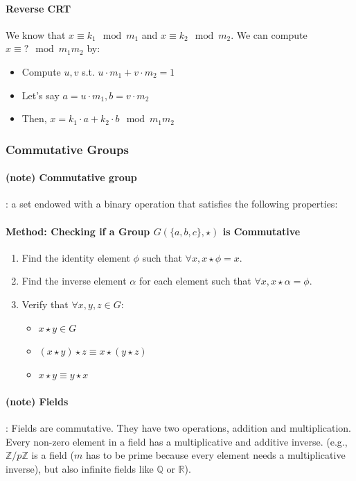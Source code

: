 \documentclass{article}
\begin{document}
\paragraph{Reverse CRT} We know that \( x \equiv k_1 \mod m_1 \) and \( x \equiv k_2 \mod m_2 \). We can compute \( x \equiv ? \mod m_1 m_2 \) by:
\begin{itemize}
    \item Compute $u, v$ s.t. $u \cdot m_1 + v \cdot m_2 = 1$
    \item Let's say $ a = u \cdot m_1, b = v \cdot m_2 $
    \item Then, $ x = k_1 \cdot a + k_2 \cdot b \mod m_1 m_2 $
\end{itemize}

\subsubsection{Commutative Groups}

\paragraph{(note) Commutative group}: a set endowed with a binary operation that satisfies the following properties:

\paragraph{Method: Checking if a Group \( G(\{a, b, c\}, \star) \) is Commutative}

\begin{enumerate}
    \item Find the identity element \( \phi \) such that \( \forall x, x \star \phi = x \).
    \item Find the inverse element \( \alpha \) for each element such that \( \forall x, x \star \alpha = \phi \).
    \item Verify that \( \forall x, y, z \in G \):
    \begin{itemize}
        \item \( x \star y \in G \)
        \item \( (x \star y) \star z \equiv x \star (y \star z) \)
        \item \( x \star y \equiv y \star x \)
    \end{itemize}
\end{enumerate}


\paragraph{(note) Fields}:  Fields are commutative. They have two operations, addition and multiplication. Every non-zero element in a field has a multiplicative and additive inverse. (e.g., \(\mathbb{Z}/p\mathbb{Z}\) is a field ($m$ has to be prime because every element needs a multiplicative inverse), but also infinite fields like \(\mathbb{Q}\) or \(\mathbb{R}\)).
\end{document}
